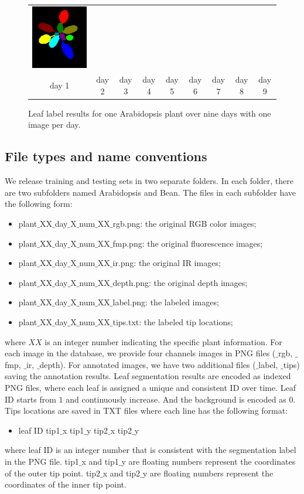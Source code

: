 \begin{figure}
\begin{centering}
\begin{tabular}{@{}c@{} c@{} c@{} c@{} c@{} c@{} c@{} c@{} c@{}}
\includegraphics[width=.11\textwidth]{Figures/labelExample/plant_1_day_9_num_13.png}\\
  day 1 & day 2 & day 3 & day 4 & day 5 & day 6 & day 7 & day 8 & day 9 \\
\end{tabular}
\caption{Leaf label results for one Arabidopsis plant over nine days with one image per day. }
\label{fig:LabelExample}
\end{centering}
\end{figure}



\subsection{File types and name conventions}
We release training and testing sets in two separate folders.
In each folder, there are two subfolders named Arabidopsis and Bean.
The files in each subfolder have the following form:
\begin{itemize}
  \item plant$\_$XX$\_$day$\_$X$\_$num$\_$XX$\_$rgb.png: the original RGB color images;
  \item plant$\_$XX$\_$day$\_$X$\_$num$\_$XX$\_$fmp.png: the original fluorescence images;
  \item plant$\_$XX$\_$day$\_$X$\_$num$\_$XX$\_$ir.png: the original IR images;
  \item plant$\_$XX$\_$day$\_$X$\_$num$\_$XX$\_$depth.png: the original depth images;
  \item plant$\_$XX$\_$day$\_$X$\_$num$\_$XX$\_$label.png: the labeled images;
  \item plant$\_$XX$\_$day$\_$X$\_$num$\_$XX$\_$tips.txt: the labeled tip locations;
\end{itemize}
where $XX$ is an integer number indicating the specific plant information.
For each image in the database, we provide four channels images in PNG files ($\_$rgb, $\_$fmp, $\_$ir, $\_$depth).
For annotated images, we have two additional files ($\_$label, $\_$tips) saving the annotation results.
Leaf segmentation results are encoded as indexed PNG files, where each leaf is assigned a unique and consistent ID over time.
Leaf ID starts from $1$ and continuously increase.
And the background is encoded as $0$.
Tips locations are saved in TXT files where each line has the following format:
\begin{itemize}
  \item leaf ID \quad tip1$\_$x \quad tip1$\_$y \quad tip2$\_$x \quad  tip2$\_$y
\end{itemize}
where leaf ID is an integer number that is consistent with the segmentation label in the PNG file.
tip1$\_$x and tip1$\_$y are floating numbers represent the coordinates of the outer tip point.
tip2$\_$x and tip2$\_$y are floating numbers represent the coordinates of the inner tip point.


